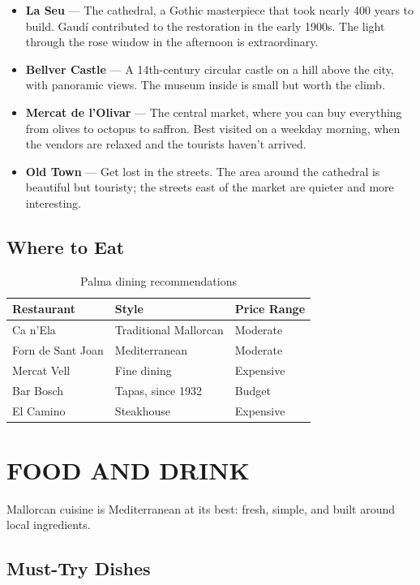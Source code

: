 \documentclass[
    language=english,
    doctype=travel-guide,
    institution=none,
]{../../omnilatex}
\begin{document}
\begin{itemize}
    \item \textbf{La Seu} --- The cathedral, a Gothic masterpiece that took nearly 400 years to build. Gaud\'{i} contributed to the restoration in the early 1900s. The light through the rose window in the afternoon is extraordinary.
    \item \textbf{Bellver Castle} --- A 14th-century circular castle on a hill above the city, with panoramic views. The museum inside is small but worth the climb.
    \item \textbf{Mercat de l'Olivar} --- The central market, where you can buy everything from olives to octopus to saffron. Best visited on a weekday morning, when the vendors are relaxed and the tourists haven't arrived.
    \item \textbf{Old Town} --- Get lost in the streets. The area around the cathedral is beautiful but touristy; the streets east of the market are quieter and more interesting.
\end{itemize}

\subsection{Where to Eat}

\begin{table}[h]
\centering
\begin{tabular}{p{3cm}p{4cm}p{4cm}}
\toprule
\textbf{Restaurant} & \textbf{Style} & \textbf{Price Range} \\
\midrule
Ca n'Ela & Traditional Mallorcan & Moderate \\
Forn de Sant Joan & Mediterranean & Moderate \\
Mercat Vell & Fine dining & Expensive \\
Bar Bosch & Tapas, since 1932 & Budget \\
El Camino & Steakhouse & Expensive \\
\bottomrule
\end{tabular}
\caption{Palma dining recommendations}
\end{table}

\section*{FOOD AND DRINK}

Mallorcan cuisine is Mediterranean at its best: fresh, simple, and built around local ingredients.

\subsection{Must-Try Dishes}
\end{document}
